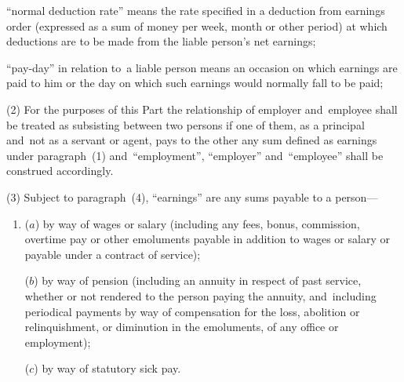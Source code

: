 \documentclass[12pt,a4paper]{article}
\begin{document}
\begin{enumerate}
“normal deduction rate” means the rate specified in a deduction from earnings order (expressed as a sum of money per week, month or other period) at which deductions are to be made from the liable person’s net earnings;

“pay-day” in relation to~a liable person means an occasion on which earnings are paid to him or the day on which such earnings would normally fall to be paid;




\end{enumerate}

(2) For the purposes of this Part the relationship of employer and~employee shall be treated as subsisting between two persons if one of them, as a principal and~not as a servant or agent, pays to the other any sum defined as earnings under paragraph~(1) and~“employment”, “employer” and~“employee” shall be construed accordingly.

(3) Subject to paragraph~(4), “earnings” are any sums payable to a person—
\begin{enumerate}\item[]
($a$) by way of wages or salary (including any fees, bonus, commission, overtime pay or other emoluments payable in addition to wages or salary or payable under a contract of service);

($b$) by way of pension (including an annuity in respect of past service, whether or not rendered to the person paying the annuity, and~including periodical payments by way of compensation for the loss, abolition or relinquishment, or diminution in the emoluments, of any office or employment);

($c$) by way of statutory sick pay.
\end{enumerate}
\end{document}
